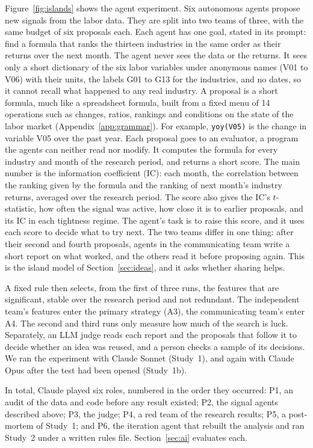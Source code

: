 \documentclass[11pt,letterpaper]{article}
\begin{document}
Figure~\ref{fig:islands} shows the agent experiment. Six autonomous agents
propose new signals from the labor data. They are split into two teams of three,
with the same budget of six proposals each. Each agent has one goal, stated in
its prompt: find a formula that ranks the thirteen industries in the same order
as their returns over the next month. The agent never sees the data or the
returns. It sees only a short dictionary of the six labor variables under
anonymous names (V01 to V06) with their units, the labels G01 to G13 for the
industries, and no dates, so it cannot recall what happened to any real
industry. A proposal is a short formula, much like a spreadsheet formula, built
from a fixed menu of 14 operations such as changes, ratios, rankings and
conditions on the state of the labor market (Appendix~\ref{app:grammar}). For
example, \texttt{yoy(V05)} is the change in variable V05 over the past year. Each
proposal goes to an evaluator, a program the agents can neither read nor modify.
It computes the formula for every industry and month of the research period,
and returns a short score. The main number is the information coefficient (IC):
each month, the correlation between the ranking given by the formula and the
ranking of next month's industry returns, averaged over the research period.
The score also gives the IC's $t$-statistic, how often the signal was active,
how close it is to earlier proposals, and its IC in each tightness regime. The
agent's task is to raise this score, and it uses each score to decide what to
try next. The two teams differ in one thing: after their second and fourth
proposals, agents in the communicating team write a short report on what
worked, and the others read it before proposing again. This is the island model
of Section~\ref{sec:ideas}, and it asks whether sharing helps.


A fixed rule then selects, from the first of three runs, the features that are
significant, stable over the research period and not redundant. The
independent team's features enter the primary strategy (A3), the communicating
team's enter A4. The second and third runs only measure how much of the search
is luck. Separately, an LLM judge reads each report and the proposals that
follow it to decide whether an idea was reused, and a person checks a sample of
its decisions. We ran the experiment with Claude Sonnet (Study~1), and again
with Claude Opus after the test had been opened (Study~1b).

In total, Claude played six roles, numbered in the order they occurred: P1,
an audit of the data and code before any result existed; P2, the signal agents
described above; P3, the judge; P4, a red team of the research results; P5, a
post-mortem of Study~1; and P6, the iteration agent that rebuilt the analysis
and ran Study~2 under a written rules file. Section~\ref{sec:ai} evaluates each.
\end{document}
